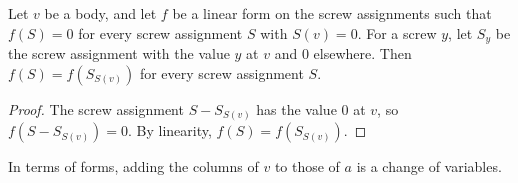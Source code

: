 \begin{lemma}[Forms that vanish where $S(v) = 0$; the form of KT eq.\ (6.28)]
  \label{lem:case-III-vanish-off-column}
  \leanok
  Let $v$ be a body, and let $f$ be a linear form on the screw
  assignments such that $f(S) = 0$ for every screw assignment $S$ with
  $S(v) = 0$. For a screw $y$, let $S_y$ be the screw assignment with
  the value $y$ at $v$ and $0$ elsewhere. Then $f(S) = f(S_{S(v)})$ for
  every screw assignment $S$.
\end{lemma}
\begin{proof}
  \leanok
  The screw assignment $S - S_{S(v)}$ has the value $0$ at $v$, so
  $f(S - S_{S(v)}) = 0$. By linearity, $f(S) = f(S_{S(v)})$.
\end{proof}

In terms of forms, adding the columns of $v$ to those of $a$ is a change
of variables.

